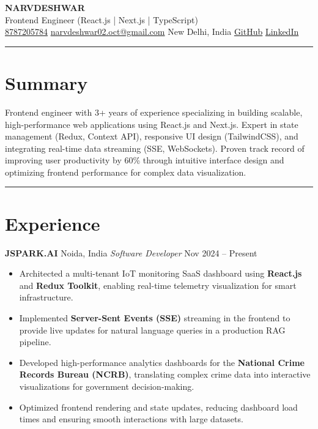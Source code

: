 \documentclass[9pt,a4paper]{article}
\begin{document}
\begin{center}
{\LARGE\textbf{NARVDESHWAR}} \\[2pt]
{\small Frontend Engineer (React.js | Next.js | TypeScript)} \\[2pt]
{\small
\href{tel:8787205784}{8787205784} \textbar{}
\href{mailto:narvdeshwar02.oct@gmail.com}{narvdeshwar02.oct@gmail.com} \textbar{}
New Delhi, India \textbar{}
\href{https://github.com/Narvdeshwar}{GitHub} \textbar{}
\href{https://linkedin.com/in/narvdeshwar}{LinkedIn}
}
\end{center}

\vspace{3pt}
{\color{myblue}\hrule}

\section*{Summary}
Frontend engineer with 3+ years of experience specializing in building scalable, high-performance web applications using React.js and Next.js. Expert in state management (Redux, Context API), responsive UI design (TailwindCSS), and integrating real-time data streaming (SSE, WebSockets). Proven track record of improving user productivity by 60\% through intuitive interface design and optimizing frontend performance for complex data visualization.

\vspace{3pt}
{\color{myblue}\hrule}

\section*{Experience}

\textbf{JSPARK.AI} \hfill Noida, India
\textit{Software Developer} \hfill Nov 2024 -- Present

\begin{itemize}
\item Architected a multi-tenant IoT monitoring SaaS dashboard using \textbf{React.js} and \textbf{Redux Toolkit}, enabling real-time telemetry visualization for smart infrastructure.
\item Implemented \textbf{Server-Sent Events (SSE)} streaming in the frontend to provide live updates for natural language queries in a production RAG pipeline.
\item Developed high-performance analytics dashboards for the \textbf{National Crime Records Bureau (NCRB)}, translating complex crime data into interactive visualizations for government decision-making.
\item Optimized frontend rendering and state updates, reducing dashboard load times and ensuring smooth interactions with large datasets.
\end{itemize}
\end{document}
